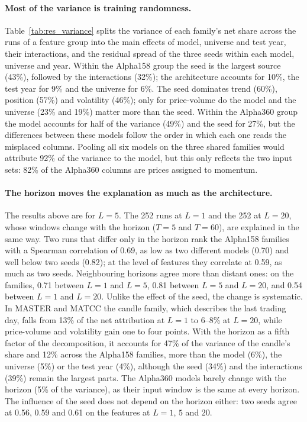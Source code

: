 \paragraph{Most of the variance is training randomness.} Table~\ref{tab:res_variance} splits the variance of each family's net share across the runs of a feature group into the main effects of model, universe and test year, their interactions, and the residual spread of the three seeds within each model, universe and year. Within the Alpha158 group the seed is the largest source (43\%), followed by the interactions (32\%); the architecture accounts for 10\%, the test year for 9\% and the universe for 6\%. The seed dominates trend (60\%), position (57\%) and volatility (46\%); only for price-volume do the model and the universe (23\% and 19\%) matter more than the seed. Within the Alpha360 group the model accounts for half of the variance (49\%) and the seed for 27\%, but the differences between these models follow the order in which each one reads the misplaced columns. Pooling all six models on the three shared families would attribute 92\% of the variance to the model, but this only reflects the two input sets: 82\% of the Alpha360 columns are prices assigned to momentum.



\paragraph{The horizon moves the explanation as much as the architecture.} The results above are for $L = 5$. The 252 runs at $L = 1$ and the 252 at $L = 20$, whose windows change with the horizon ($T = 5$ and $T = 60$), are explained in the same way. Two runs that differ only in the horizon rank the Alpha158 families with a Spearman correlation of 0.69, as low as two different models (0.70) and well below two seeds (0.82); at the level of features they correlate at 0.59, as much as two seeds. Neighbouring horizons agree more than distant ones: on the families, 0.71 between $L = 1$ and $L = 5$, 0.81 between $L = 5$ and $L = 20$, and 0.54 between $L = 1$ and $L = 20$. Unlike the effect of the seed, the change is systematic. In MASTER and MATCC the candle family, which describes the last trading day, falls from 13\% of the net attribution at $L = 1$ to 6--8\% at $L = 20$, while price-volume and volatility gain one to four points. With the horizon as a fifth factor of the decomposition, it accounts for 47\% of the variance of the candle's share and 12\% across the Alpha158 families, more than the model (6\%), the universe (5\%) or the test year (4\%), although the seed (34\%) and the interactions (39\%) remain the largest parts. The Alpha360 models barely change with the horizon (5\% of the variance), as their input window is the same at every horizon. The influence of the seed does not depend on the horizon either: two seeds agree at 0.56, 0.59 and 0.61 on the features at $L = 1$, $5$ and $20$. %


